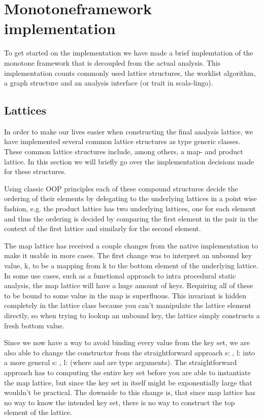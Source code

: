 \chapter{Monotoneframework implementation}

To get started on the implementation we have made a brief implemtation of the monotone framework that is decoupled from the actual analysis.
This implementation counts commonly used lattice structures, the worklist algorithm, a graph structure and an analysis interface (or trait in scala-lingo).

\section{Lattices}

In order to make our lives easier when constructing the final analysis lattice, we have implemented several common lattice structures as type generic classes. 
These common lattice structures include, among others, a map- and product lattice. 
In this section we will briefly go over the implementation decisions made for these structures.

Using classic OOP principles each of these compound structures decide the ordering of their elements by delegating to the underlying lattices in a point wise fashion, 
e.g. the product lattice has two underlying lattices, 
one for each element and thus the ordering is decided by comparing the first element in the pair in the context of the first lattice and similarly for the second element.

The map lattice has received a couple changes from the native implementation to make it usable in more cases. 
The first change was to interpret an unbound key value, k, to be a mapping from k to the bottom element of the underlying lattice. 
In some use cases, such as a functional approach to intra procedural static analysis, the map lattice will have a huge amount of keys. 
Requiring all of these to be bound to some value in the map is superfluous. 
This invariant is hidden completely in the lattice class because you can't manipulate the lattice element directly, 
so when trying to lookup an unbound key, the lattice simply constructs a fresh bottom value.

Since we now have a way to avoid binding every value from the key set, we are also able to change the constructor 
from the straightforward approach s: , l:  into a more general s: , l:  
(where  and  are type arguments). The straightforward approach has to computing the entire key set before you are able to 
instantiate the map lattice, but since the key set in itself might be exponentially large that wouldn't be practical. The downside to this change is, 
that since map lattice has no way to know the intended key set, there is no way to construct the top element of the lattice.

